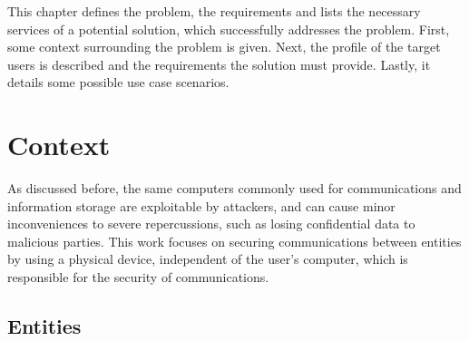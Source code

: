 \cleardoublepage
\label{chap:problem}

This chapter defines the problem, the requirements and lists the necessary services of a potential solution, which successfully addresses the problem.
First, some context surrounding the problem is given. Next, the profile of the target users is described and the requirements the solution must provide. Lastly, it details some possible use case scenarios.

\section{Context}\label{chap:problem:context}

As discussed before, the same computers commonly used for communications and information storage are exploitable by attackers, and can cause minor inconveniences to severe repercussions, such as losing confidential data to malicious parties.
This work focuses on securing communications between entities by using a physical device, independent of the user's computer, which is responsible for the security of communications.

\subsection{Entities}\label{chap:problem:entities}


